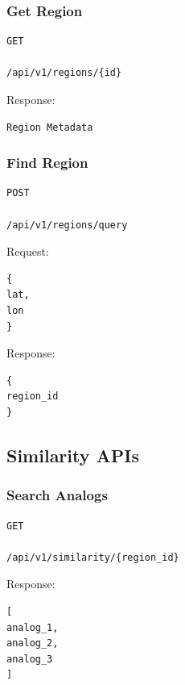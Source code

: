 \documentclass[11pt,a4paper]{article}
\begin{document}
\subsubsection{Get Region}

\begin{verbatim}
GET

/api/v1/regions/{id}
\end{verbatim}

Response:

\begin{verbatim}
Region Metadata
\end{verbatim}


\subsubsection{Find Region}

\begin{verbatim}
POST

/api/v1/regions/query
\end{verbatim}

Request:

\begin{verbatim}
{
lat,
lon
}
\end{verbatim}

Response:

\begin{verbatim}
{
region_id
}
\end{verbatim}

\subsection{Similarity APIs}

\subsubsection{Search Analogs}

\begin{verbatim}
GET

/api/v1/similarity/{region_id}
\end{verbatim}

Response:

\begin{verbatim}
[
analog_1,
analog_2,
analog_3
]
\end{verbatim}
\end{document}
